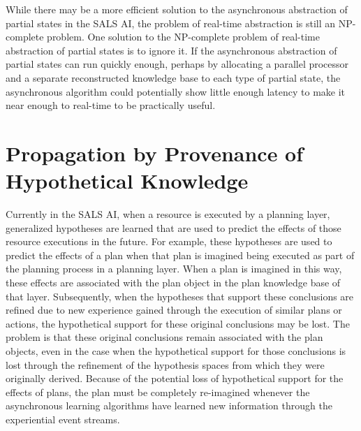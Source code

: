 While there may be a more efficient solution to the asynchronous
abstraction of partial states in the SALS AI, the problem of real-time
abstraction is still an NP-complete problem.  One solution to the
NP-complete problem of real-time abstraction of partial states is to
ignore it.  If the asynchronous abstraction of partial states can run
quickly enough, perhaps by allocating a parallel processor and a
separate reconstructed knowledge base to each type of partial state,
the asynchronous algorithm could potentially show little enough
latency to make it near enough to real-time to be practically useful.

\section{Propagation by Provenance of Hypothetical Knowledge}

Currently in the SALS AI, when a resource is executed by a planning
layer, generalized hypotheses are learned that are used to predict the
effects of those resource executions in the future.  For example,
these hypotheses are used to predict the effects of a plan when that
plan is imagined being executed as part of the planning process in a
planning layer.  When a plan is imagined in this way, these effects
are associated with the plan object in the plan knowledge base of that
layer.  Subsequently, when the hypotheses that support these
conclusions are refined due to new experience gained through the
execution of similar plans or actions, the hypothetical support for
these original conclusions may be lost.  The problem is that these
original conclusions remain associated with the plan objects, even in
the case when the hypothetical support for those conclusions is lost
through the refinement of the hypothesis spaces from which they were
originally derived.  Because of the potential loss of hypothetical
support for the effects of plans, the plan must be completely
re-imagined whenever the asynchronous learning algorithms have learned
new information through the experiential event streams.

